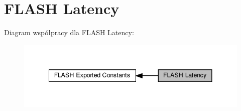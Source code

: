 \hypertarget{group___f_l_a_s_h___latency}{}\section{F\+L\+A\+SH Latency}
\label{group___f_l_a_s_h___latency}
Diagram współpracy dla F\+L\+A\+SH Latency\+:\nopagebreak
\begin{figure}[H]
\begin{center}
\leavevmode
\includegraphics[width=341pt]{group___f_l_a_s_h___latency}
\end{center}
\end{figure}
